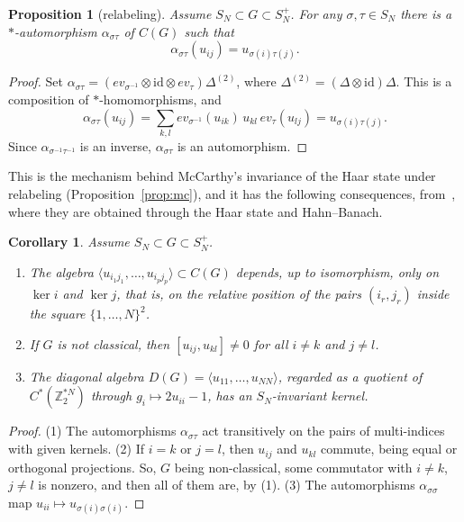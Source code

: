\documentclass[11pt]{amsart}
\newtheorem{proposition}[theorem]{Proposition}
\newtheorem{corollary}[theorem]{Corollary}
\theoremstyle{definition}
\theoremstyle{remark}
\theoremstyle{plain}
\numberwithin{equation}{section}
\numberwithin{table}{section}
\newcommand{\Z}{\mathbb Z}
\begin{document}
\begin{proposition}[relabeling]\label{prop:relabel}
Assume $S_N\subset G\subset S_N^+$. For any $\sigma,\tau\in S_N$ there is a $*$-automorphism $\alpha_{\sigma\tau}$ of $C(G)$ such that
\[
\alpha_{\sigma\tau}(u_{ij})=u_{\sigma(i)\tau(j)}.
\]
\end{proposition}

\begin{proof}
Set $\alpha_{\sigma\tau}=(ev_{\sigma^{-1}}\otimes\mathrm{id}\otimes ev_\tau)\Delta^{(2)}$, where $\Delta^{(2)}=(\Delta\otimes\mathrm{id})\Delta$. This is a composition of $*$-homomorphisms, and
\[
\alpha_{\sigma\tau}(u_{ij})=\sum_{k,l}ev_{\sigma^{-1}}(u_{ik})\,u_{kl}\,ev_\tau(u_{lj})=u_{\sigma(i)\tau(j)}.
\]
Since $\alpha_{\sigma^{-1}\tau^{-1}}$ is an inverse, $\alpha_{\sigma\tau}$ is an automorphism.
\end{proof}

This is the mechanism behind McCarthy's invariance of the Haar state under relabeling (Proposition~\ref{prop:mc}), and it has the following consequences, from~\cite[Props.~10.38, 10.39]{bqp}, where they are obtained through the Haar state and Hahn--Banach.

\begin{corollary}\label{cor:relabel}
Assume $S_N\subset G\subset S_N^+$.
\begin{enumerate}
\item The algebra $\langle u_{i_1j_1},\dots,u_{i_pj_p}\rangle\subset C(G)$ depends, up to isomorphism, only on $\ker i$ and $\ker j$, that is, on the relative position of the pairs $(i_r,j_r)$ inside the square $\{1,\dots,N\}^2$.
\item If $G$ is not classical, then $[u_{ij},u_{kl}]\ne0$ for all $i\ne k$ and $j\ne l$.
\item The diagonal algebra $D(G)=\langle u_{11},\dots,u_{NN}\rangle$, regarded as a quotient of $C^*(\Z_2^{*N})$ through $g_i\mapsto2u_{ii}-1$, has an $S_N$-invariant kernel.
\end{enumerate}
\end{corollary}

\begin{proof}
(1) The automorphisms $\alpha_{\sigma\tau}$ act transitively on the pairs of multi-indices with given kernels. (2) If $i=k$ or $j=l$, then $u_{ij}$ and $u_{kl}$ commute, being equal or orthogonal projections. So, $G$ being non-classical, some commutator with $i\ne k$, $j\ne l$ is nonzero, and then all of them are, by (1). (3) The automorphisms $\alpha_{\sigma\sigma}$ map $u_{ii}\mapsto u_{\sigma(i)\sigma(i)}$.
\end{proof}
\end{document}
